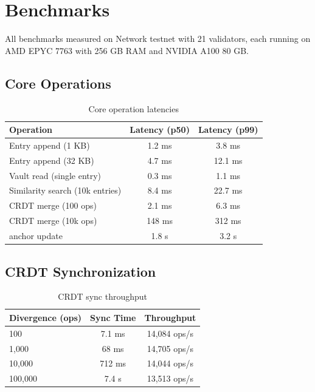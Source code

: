 \section{Benchmarks}

\label{sec:benchmarks}

All benchmarks measured on \Zoo{} Network testnet with 21 validators, each running on AMD EPYC 7763 with 256 GB RAM and NVIDIA A100 80 GB.

\subsection{Core Operations}

\begin{table}[h]
\centering
\begin{tabular}{lcc}
\toprule
\textbf{Operation} & \textbf{Latency (p50)} & \textbf{Latency (p99)} \\
\midrule
Entry append (1 KB) & 1.2 ms & 3.8 ms \\
Entry append (32 KB) & 4.7 ms & 12.1 ms \\
Vault read (single entry) & 0.3 ms & 1.1 ms \\
Similarity search (10k entries) & 8.4 ms & 22.7 ms \\
CRDT merge (100 ops) & 2.1 ms & 6.3 ms \\
CRDT merge (10k ops) & 148 ms & 312 ms \\
\IChain{} anchor update & 1.8 s & 3.2 s \\
\bottomrule
\end{tabular}
\caption{Core operation latencies}
\label{tab:core_bench}
\end{table}

\subsection{CRDT Synchronization}

\begin{table}[h]
\centering
\begin{tabular}{lcc}
\toprule
\textbf{Divergence (ops)} & \textbf{Sync Time} & \textbf{Throughput} \\
\midrule
100 & 7.1 ms & 14,084 ops/s \\
1,000 & 68 ms & 14,705 ops/s \\
10,000 & 712 ms & 14,044 ops/s \\
100,000 & 7.4 s & 13,513 ops/s \\
\bottomrule
\end{tabular}
\caption{CRDT sync throughput}
\label{tab:crdt_bench}
\end{table}

